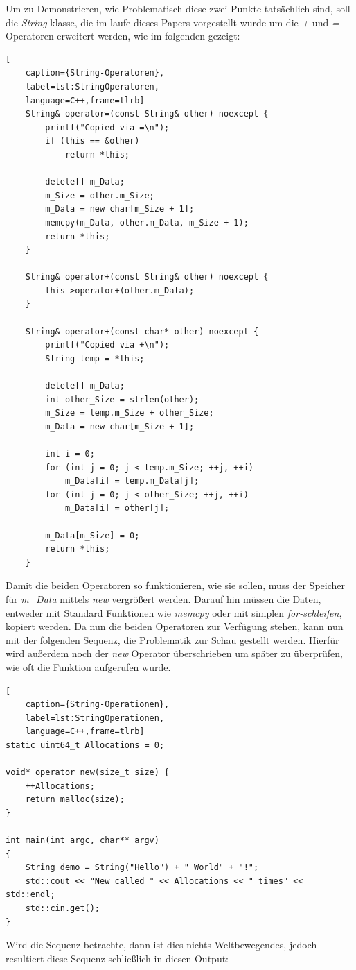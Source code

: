 Um zu Demonstrieren, wie Problematisch diese zwei Punkte tatsächlich sind, soll die \emph{String}
klasse, die im laufe dieses Papers vorgestellt wurde um die \emph{+} und \emph{=} Operatoren
erweitert werden, wie im folgenden gezeigt:
\newpage
\begin{lstlisting}[
    caption={String-Operatoren},
    label=lst:StringOperatoren,
    language=C++,frame=tlrb]
	String& operator=(const String& other) noexcept {
		printf("Copied via =\n");
		if (this == &other)
			return *this;

		delete[] m_Data;
		m_Size = other.m_Size;
		m_Data = new char[m_Size + 1];
		memcpy(m_Data, other.m_Data, m_Size + 1);
		return *this;
	}

	String& operator+(const String& other) noexcept {
		this->operator+(other.m_Data);
	}

	String& operator+(const char* other) noexcept {
		printf("Copied via +\n");
		String temp = *this;

		delete[] m_Data;
		int other_Size = strlen(other);
		m_Size = temp.m_Size + other_Size;
		m_Data = new char[m_Size + 1];

		int i = 0;
		for (int j = 0; j < temp.m_Size; ++j, ++i)
			m_Data[i] = temp.m_Data[j];
		for (int j = 0; j < other_Size; ++j, ++i)
			m_Data[i] = other[j];

		m_Data[m_Size] = 0;
		return *this;
	}
\end{lstlisting}

Damit die beiden Operatoren so funktionieren, wie sie sollen, muss der Speicher für \emph{m\_Data}
mittels \emph{new} vergrößert werden. Darauf hin müssen die Daten, entweder mit Standard Funktionen
wie \emph{memcpy} oder mit simplen \emph{for-schleifen}, kopiert werden.
\newline
\newline
Da nun die beiden Operatoren zur Verfügung stehen, kann nun mit der folgenden Sequenz, die
Problematik zur Schau gestellt werden. Hierfür wird außerdem noch der \emph{new} Operator
überschrieben um später zu überprüfen, wie oft die Funktion aufgerufen wurde.

\begin{lstlisting}[
    caption={String-Operationen},
    label=lst:StringOperationen,
    language=C++,frame=tlrb]
static uint64_t Allocations = 0;

void* operator new(size_t size) {
	++Allocations;
	return malloc(size);
}

int main(int argc, char** argv)
{
	String demo = String("Hello") + " World" + "!";
	std::cout << "New called " << Allocations << " times" << std::endl;
	std::cin.get();
}
\end{lstlisting}
Wird die Sequenz betrachte, dann ist dies nichts Weltbewegendes, jedoch resultiert diese Sequenz
schließlich in diesen Output:

